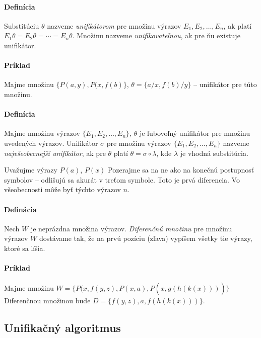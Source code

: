 \paragraph{Definícia} Substitúciu $\theta$ nazveme \emph{unifikátorom} pre
množinu výrazov $E_1, E_2, \ldots, E_n$, ak platí $E_1\theta = E_2\theta =
\cdots = E_n\theta$. Množinu nazveme \emph{unifikovateľnou}, ak pre ňu existuje
unifikátor.

\paragraph{Príklad} Majme množinu $\{ P(a,y), P(x,f(b)\}$, $\theta = \{a/x,
f(b)/y\}$ -- unifikátor pre túto množinu. 

\paragraph{Definícia} Majme množinu výrazov $\{ E_1, E_2, \ldots, E_n\}$,
$\theta$ je ľubovoľný unifikátor pre množinu uvedených výrazov. Unifikátor
$\sigma$ pre množinu výrazov $\{E_1, E_2, \ldots, E_n\}$ nazveme
\emph{najvšeobecnejší unifikátor}, ak pre $\theta$ platí $\theta = \sigma \circ
\lambda$, kde $\lambda$ je vhodná substitúcia.

\par Uvažujme výrazy $P(a)$, $P(x)$ Pozerajme sa na ne ako na konečnú
postupnosť symbolov -- odlišujú sa akurát v treťom symbole. Toto je prvá
diferencia. Vo všeobecnosti môže byť týchto výrazov $n$.

\paragraph{Definácia} Nech $W$ je neprázdna množina výrazov. \emph{Diferenčnú
množinu}
pre množinu výrazov $W$ dostávame tak, že na prvú pozíciu (zľava) vypíšem všetky
tie výrazy, ktoré sa líšia. 

\paragraph{Príklad} Majme množinu $W = \{P(x,\underline{f(y,z)},
P(x,\underline{a}), P(x,\underline{g(h(k(x)))}) \}$
Diferenčnou množinou bude $D= \{ f(y,z), a, f(h(k(x)))\}$. 

\subsection{Unifikačný algoritmus}

